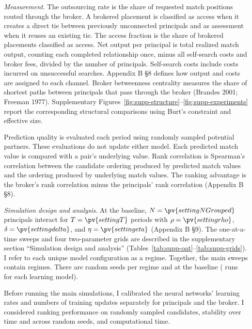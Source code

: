 \emph{Measurement}. The outsourcing rate is the share of requested match positions routed through the broker. A brokered placement is classified as access when it creates a direct tie between previously unconnected principals and as assessment when it reuses an existing tie. The access fraction is the share of brokered placements classified as access. Net output per principal is total realized match output, counting each completed relationship once, minus all self-search costs and broker fees, divided by the number of principals. Self-search costs include costs incurred on unsuccessful searches. Appendix B \S8 defines how output and costs are assigned to each channel. Broker betweenness centrality measures the share of shortest paths between principals that pass through the broker (Brandes 2001; Freeman 1977). Supplementary Figures~\ref{fig:supp-structure}--\ref{fig:supp-experiments} report the corresponding structural comparisons using Burt's constraint and effective size.

Prediction quality is evaluated each period using randomly sampled potential partners. These evaluations do not update either model. Each predicted match value is compared with a pair's underlying value. Rank correlation is Spearman's correlation between the candidate ordering produced by predicted match values and the ordering produced by underlying match values. The ranking advantage is the broker's rank correlation minus the principals' rank correlation (Appendix B \S8).

\emph{Simulation design and analysis}. At the baseline, $N=\pv{settingNGrouped}$ principals interact for $T=\pv{settingT}$ periods with $\rho=\pv{settingrho}$, $\delta=\pv{settingdelta}$, and $\eta=\pv{settingeta}$ (Appendix B \S9). The one-at-a-time sweeps and four two-parameter grids are described in the supplementary section ``Simulation design and analysis'' (Tables~\ref{tab:supp-oat}--\ref{tab:supp-grids}). I refer to each unique model configuration as a regime. Together, the main sweeps contain  regimes. There are  random seeds per regime and  at the baseline ( runs for each learning model).

Before running the main simulations, I calibrated the neural networks' learning rates and numbers of training updates separately for principals and the broker. I considered ranking performance on randomly sampled candidates, stability over time and across random seeds, and computational time.

